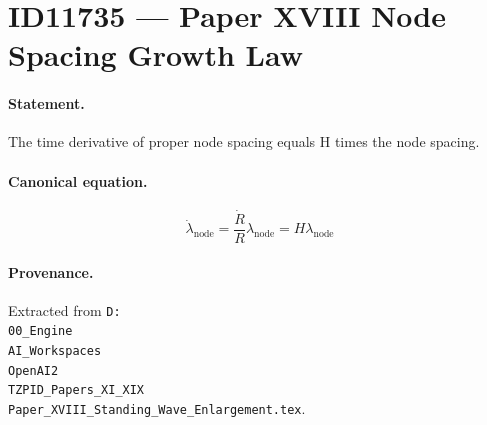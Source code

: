 \section*{ID11735 --- Paper XVIII Node Spacing Growth Law}

\paragraph{Statement.}
The time derivative of proper node spacing equals H times the node spacing.

\paragraph{Canonical equation.}
\[
\dot\lambda_{\mathrm{node}}=\frac{\dot R}{R}\lambda_{\mathrm{node}}=H\lambda_{\mathrm{node}}
\]

\paragraph{Provenance.}
Extracted from \texttt{D:\\00\_Engine\\AI\_Workspaces\\OpenAI2\\TZPID\_Papers\_XI\_XIX\\Paper\_XVIII\_Standing\_Wave\_Enlargement.tex}.
